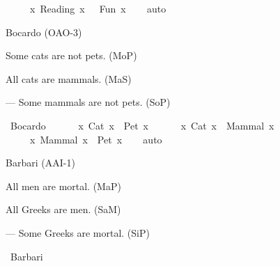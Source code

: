 \begin{isabellebody}
\begin{exercise}[subtitle=Silogizmi]
\ \ \ \ {\isacharparenleft}{\kern0pt}{\isasymexists}\ x{\isachardot}{\kern0pt}\ Reading\ x\ {\isasymand}\ {\isasymnot}\ Fun\ x{\isacharparenright}{\kern0pt}{\isachardoublequoteclose}\isanewline
%
\isadelimproof
\ \ %
\endisadelimproof
%
\isatagproof
{}\isamarkupfalse%
\ auto%
\endisatagproof
{\isafoldproof}%
%
\isadelimproof
%
\endisadelimproof
%
\begin{isamarkuptext}%
Bocardo (OAO-3)%
\end{isamarkuptext}\isamarkuptrue%
%
\begin{isamarkuptext}%
Some cats are not pets. (MoP)%
\end{isamarkuptext}\isamarkuptrue%
%
\begin{isamarkuptext}%
All cats are mammals. (MaS)%
\end{isamarkuptext}\isamarkuptrue%
%
\begin{isamarkuptext}%
— Some mammals are not pets. (SoP)%
\end{isamarkuptext}\isamarkuptrue%
\isamarkupfalse%
\ Bocardo{\isacharcolon}{\kern0pt}\ {\isachardoublequoteopen}\isanewline
\ \ \ \ {\isacharparenleft}{\kern0pt}{\isasymexists}\ x{\isachardot}{\kern0pt}\ Cat\ x\ {\isasymand}\ {\isasymnot}Pet\ x{\isacharparenright}{\kern0pt}\ {\isasymand}\isanewline
\ \ \ \ {\isacharparenleft}{\kern0pt}{\isasymforall}\ x{\isachardot}{\kern0pt}\ Cat\ x\ {\isasymlongrightarrow}\ Mammal\ x{\isacharparenright}{\kern0pt}\ {\isasymlongrightarrow}\isanewline
\ \ \ \ {\isacharparenleft}{\kern0pt}{\isasymexists}\ x{\isachardot}{\kern0pt}\ Mammal\ x\ {\isasymand}\ {\isasymnot}Pet\ x{\isacharparenright}{\kern0pt}{\isachardoublequoteclose}\isanewline
%
\isadelimproof
\ \ %
\endisadelimproof
%
\isatagproof
{}\isamarkupfalse%
\ auto%
\endisatagproof
{\isafoldproof}%
%
\isadelimproof
%
\endisadelimproof
%
\begin{isamarkuptext}%
Barbari (AAI-1)%
\end{isamarkuptext}\isamarkuptrue%
%
\begin{isamarkuptext}%
All men are mortal. (MaP)%
\end{isamarkuptext}\isamarkuptrue%
%
\begin{isamarkuptext}%
All Greeks are men. (SaM)%
\end{isamarkuptext}\isamarkuptrue%
%
\begin{isamarkuptext}%
— Some Greeks are mortal. (SiP)%
\end{isamarkuptext}\isamarkuptrue%
\isamarkupfalse%
\ Barbari{\isacharcolon}{\kern0pt}\ {\isachardoublequoteopen}\isanewline

\end{exercise}
\end{isabellebody}
